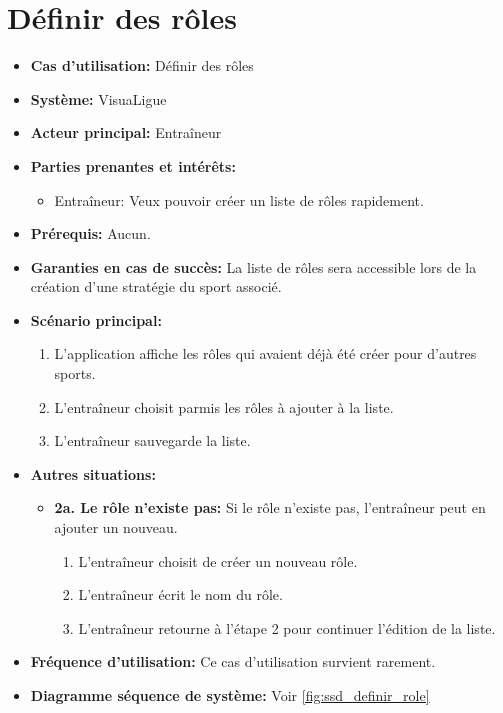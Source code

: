 \section{Définir des rôles}
\label{sec:definir_des_roles}

\begin{itemize}
    \item \textbf{Cas d'utilisation:} D\'efinir des r\^oles
    \item \textbf{Syst\`eme:} VisuaLigue
    \item \textbf{Acteur principal:} Entra\^ineur
    \item \textbf{Parties prenantes et int\'er\^ets:}
        \begin{itemize}
            \item Entraîneur: Veux pouvoir créer un liste de rôles rapidement.
        \end{itemize}
    \item \textbf{Pr\'erequis:} Aucun.
    \item \textbf{Garanties en cas de succ\`es:} La liste de rôles sera accessible lors de la création d'une stratégie du sport associé.
    \item \textbf{Sc\'enario principal:}
        \begin{enumerate}
            \item L'application affiche les rôles qui avaient déjà été créer pour d'autres sports.
            \item L'entraîneur choisit parmis les rôles à ajouter à la liste.
            \item L'entraîneur sauvegarde la liste.
        \end{enumerate}
    \item \textbf{Autres situations:}
        \begin{itemize}
            \item \textbf{2a. Le rôle n'existe pas:} Si le rôle n'existe pas, l'entraîneur peut en ajouter un nouveau.
                \begin{enumerate}
                    \item L'entraîneur choisit de créer un nouveau rôle.
                    \item L'entraîneur écrit le nom du rôle.
                    \item L'entraîneur retourne à l'étape 2 pour continuer l'édition de la liste.
                \end{enumerate}
        \end{itemize}
    \item \textbf{Fréquence d'utilisation:} Ce cas d'utilisation survient rarement.
    \item \textbf{Diagramme s\'equence de syst\`eme:} Voir \ref{fig:ssd_definir_role}
\end{itemize}
